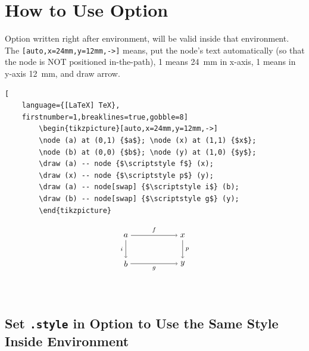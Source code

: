 \documentclass[lualatex]{jlreq}
\begin{document}
\section{How to Use Option}

Option written right after environment, will be valid inside that environment. The \verb|[auto,x=24mm,y=12mm,->]| means, put the node's text automatically (so that the node is NOT positioned in-the-path), 1 means \qty{24}{\mm} in x-axis, 1 means in y-axis \qty{12}{\mm}, and draw arrow.
\\[1em]
\begin{minipage}{0.58 \textwidth}
    \begin{lstlisting}[
    language={[LaTeX] TeX},
    firstnumber=1,breaklines=true,gobble=8]
        \begin{tikzpicture}[auto,x=24mm,y=12mm,->]
        \node (a) at (0,1) {$a$}; \node (x) at (1,1) {$x$};
        \node (b) at (0,0) {$b$}; \node (y) at (1,0) {$y$};
        \draw (a) -- node {$\scriptstyle f$} (x);
        \draw (x) -- node {$\scriptstyle p$} (y);
        \draw (a) -- node[swap] {$\scriptstyle i$} (b);
        \draw (b) -- node[swap] {$\scriptstyle g$} (y);
        \end{tikzpicture}
    \end{lstlisting}
\end{minipage}
\hfill
\begin{minipage}{0.38 \textwidth}
    \[
        \begin{tikzpicture}[auto,x=24mm,y=12mm,->]
        \node (a) at (0,1) {$a$}; \node (x) at (1,1) {$x$};
        \node (b) at (0,0) {$b$}; \node (y) at (1,0) {$y$};
        \draw (a) -- node {$\scriptstyle f$} (x);
        \draw (x) -- node {$\scriptstyle p$} (y);
        \draw (a) -- node[swap] {$\scriptstyle i$} (b);
        \draw (b) -- node[swap] {$\scriptstyle g$} (y);
        \end{tikzpicture}
    \]
\end{minipage}
\\[1em]

\subsection{Set \texttt{.style} in Option to Use the Same Style Inside Environment}
\end{document}
